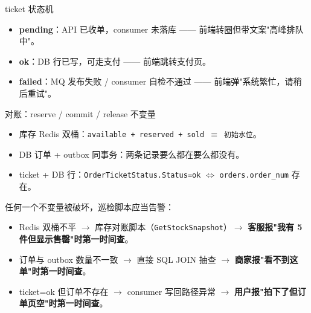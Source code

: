 \documentclass[aspectratio=169,11pt]{beamer}
\begin{document}
\begin{frame}[shrink]{ticket 状态机}
\centering
{}
\vspace{2mm}
\begin{itemize}
  \item \textbf{pending}：API 已收单，consumer 未落库 —— 前端转圈但带文案"高峰排队中"。
  \item \textbf{ok}：DB 行已写，可走支付 —— 前端跳转支付页。
  \item \textbf{failed}：MQ 发布失败 / consumer 自检不通过 —— 前端弹"系统繁忙，请稍后重试"。
\end{itemize}
\end{frame}

\begin{frame}[shrink]{对账：reserve / commit / release 不变量}
\begin{itemize}
  \item 库存 Redis 双桶：\texttt{available + reserved + sold $\equiv$ 初始水位}。
  \item DB 订单 + outbox 同事务：两条记录要么都在要么都没有。
  \item ticket + DB 行：\texttt{OrderTicketStatus.Status=ok} $\iff$ \texttt{orders.order\_num} 存在。
\end{itemize}
\vspace{2mm}
任何一个不变量被破坏，巡检脚本应当告警：
\begin{itemize}
  \item Redis 双桶不平 $\to$ 库存对账脚本（\texttt{GetStockSnapshot}）$\to$ \textbf{客服报"我有 5 件但显示售罄"时第一时间查}。
  \item 订单与 outbox 数量不一致 $\to$ 直接 SQL JOIN 抽查 $\to$ \textbf{商家报"看不到这单"时第一时间查}。
  \item ticket=ok 但订单不存在 $\to$ consumer 写回路径异常 $\to$ \textbf{用户报"拍下了但订单页空"时第一时间查}。
\end{itemize}
\end{frame}
\end{document}
